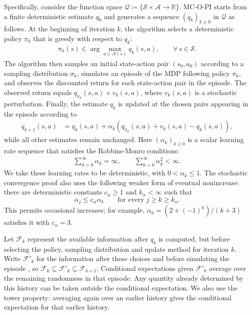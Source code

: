 \documentclass[twoside,11pt]{article}
\newcommand{\qset}{\mathcal{Q}}
\newcommand{\aset}{\mathcal{A}}
\newcommand{\sset}{\mathcal{S}}
\newcommand{\pol}{\pi}
\newcommand{\start}{\sigma}
\newcommand{\lrate}{\alpha}
\DeclareRobustCommand{\reviewbarstart}{%
  \ifhmode %
    \vadjust{\vbox to 0pt{%
      \vskip-\ht\strutbox %
      \vskip-\dp\strutbox %
      \cbstart[\changebarwidth] %
      \vss %
    }}%
  \else %
    \cbstart[\changebarwidth]%
  \fi %
} %
\providecommand{\DIFadd}[1]{#1} %
\providecommand{\DIFaddbegin}{\reviewbarstart} %
\providecommand{\DIFaddend}{\protect\cbend} %
\def\DIFadd#1{#1}%
\def\DIFaddbegin{}%
\def\DIFaddend{}%
\begin{document}
Specifically, consider the function space $\qset \coloneqq \{ \mathcal S \times \mathcal A \to \mathbb R \}$.
MC-O-PI \DIFaddbegin \DIFadd{starts from a finite deterministic estimate $q_0$ and }\DIFaddend generates a sequence $(q_k)_{k \ge 0}$ in $\qset$ as follows.
At the beginning of iteration $k$, the algorithm selects a deterministic policy $\pi_k$ that is greedy with respect to $q_k$:
\begin{align}
\label{eq: greedy policy definition}
    \pol_k(s) \in \arg\max_{a \in \aset(s)} q_k(s,a),
    \qquad \forall \, s \in \sset .
\end{align}
The algorithm then samples an initial state-action pair $(s_0, a_0)$ according to a sampling distribution $\start_k$,
simulates an episode of the MDP following policy $\pol_k$, and observes the discounted return for each state-action pair in the episode.
The observed return equals $q_{\pi_k}(s,a) + v_k(s,a)$, where $v_k(s,a)$ is a stochastic perturbation.
Finally, the estimate $q_k$ is updated at \DIFaddbegin \DIFadd{the chosen }\DIFaddend pairs appearing in the episode
according to
 \DIFaddbegin \begin{align}
\DIFadd{\label{eq: MC eval update}
    q_{k+1}(s, a)
    }&\DIFadd{= q_k(s,a) +  \lrate_k( q_{\pol_k}(s, a) + v_k(s, a) - q_k(s,a) ) ,
}\end{align}\DIFaddend 
 \DIFaddbegin \DIFadd{while all other estimates remain unchanged. Here }\DIFaddend $(\lrate_k)_{k \ge 0}$ is a scalar learning rate sequence that satisfies the Robbins-Monro conditions:
 \DIFaddbegin \begin{align}
 \DIFadd{\label{eq: robbins monro conditions}
    \sum_{k =0}^\infty \alpha_k = \infty ,
    \qquad
    \sum_{k =0}^\infty \alpha_k^2 < \infty .
}\end{align}\DIFaddend 
\DIFaddbegin \DIFadd{We take these learning rates to be deterministic, with $0<\alpha_k\le1$. The stochastic convergence proof also uses the following weaker form of eventual nonincrease: there are deterministic constants $c_\alpha\ge1$ and $k_\alpha<\infty$ such that
}\begin{equation}
\DIFadd{\label{eq:comparison}
\alpha_j\le c_\alpha\alpha_k\qquad\text{for every }j\ge k\ge k_\alpha.
}\end{equation}
\DIFadd{This permits occasional increases; for example, $\alpha_k=(2+(-1)^k)/(k+3)$ satisfies it with $c_\alpha=3$.
}\DIFaddend 

Let $\mathcal F_k$ represent the available information after $q_k$ is computed, but before selecting the  policy, sampling  \DIFaddbegin \DIFadd{distribution and update method for iteration $k$.
Write $\mathcal F'_k$ for the information after these choices and before }\DIFaddend simulating the episode \DIFaddbegin \DIFadd{, so $\mathcal F_k\subseteq\mathcal F'_k\subseteq\mathcal F_{k+1}$.
Conditional expectations given $\mathcal F'_k$ average over the remaining randomness in that episode. Any quantity already determined by this history can be taken outside the conditional expectation. We also use the tower property: averaging again over an earlier history gives the conditional expectation for that earlier history.
}\DIFaddend 
\end{document}
